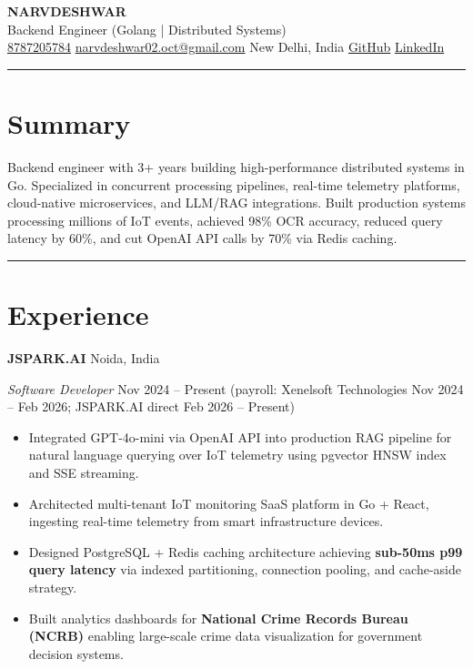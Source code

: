 \documentclass[9pt,a4paper]{article}
\begin{document}
\begin{center}
{\LARGE\textbf{NARVDESHWAR}} \\[2pt]
{\small Backend Engineer (Golang | Distributed Systems)} \\[2pt]
{\small
\href{tel:8787205784}{8787205784} \textbar{}
\href{mailto:narvdeshwar02.oct@gmail.com}{narvdeshwar02.oct@gmail.com} \textbar{}
New Delhi, India \textbar{}
\href{https://github.com/Narvdeshwar}{GitHub} \textbar{}
\href{https://linkedin.com/in/narvdeshwar}{LinkedIn}
}
\end{center}

\vspace{3pt}
{\color{myblue}\hrule}

\section*{Summary}
Backend engineer with 3+ years building high-performance distributed systems in Go. Specialized in concurrent processing pipelines, real-time telemetry platforms, cloud-native microservices, and LLM/RAG integrations. Built production systems processing millions of IoT events, achieved 98\% OCR accuracy, reduced query latency by 60\%, and cut OpenAI API calls by 70\% via Redis caching.

\vspace{3pt}
{\color{myblue}\hrule}

\section*{Experience}

\textbf{JSPARK.AI} \hfill Noida, India

\textit{Software Developer} \hfill Nov 2024 -- Present {\small\color{gray}(payroll: Xenelsoft Technologies Nov 2024 -- Feb 2026; JSPARK.AI direct Feb 2026 -- Present)}

\begin{itemize}
\item Integrated GPT-4o-mini via OpenAI API into production RAG pipeline for natural language querying over IoT telemetry using pgvector HNSW index and SSE streaming.
\item Architected multi-tenant IoT monitoring SaaS platform in Go + React, ingesting real-time telemetry from smart infrastructure devices.
\item Designed PostgreSQL + Redis caching architecture achieving \textbf{sub-50ms p99 query latency} via indexed partitioning, connection pooling, and cache-aside strategy.
\item Built analytics dashboards for \textbf{National Crime Records Bureau (NCRB)} enabling large-scale crime data visualization for government decision systems.
\end{itemize}
\end{document}
